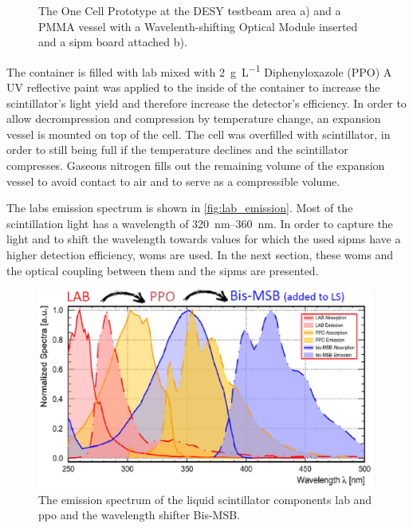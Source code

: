 \begin{figure}
\begin{subfigure}[b]{.54\textwidth}
		\caption[PMMA vessel]{}
		\label{fig:pmma_vessel}
	\end{subfigure}
	\caption[One Cell Prototype and PMMA vessel]{The One Cell Prototype at the DESY testbeam area a) and a PMMA vessel with a Wavelenth-shifting Optical Module inserted and a \ac{sipm} board attached b). \cite{}}
	\label{fig:one_cell_and_pmma}
\end{figure}

The container is filled with \ac{lab} mixed with \SI{2}{\gram\per\liter} Diphenyloxazole (PPO)%
A UV reflective paint was applied to the inside of the container to increase the scintillator's light yield and therefore increase the detector's efficiency.
In order to allow decrompression and compression by temperature change, an expansion vessel is mounted on top of the cell.
The cell was overfilled with scintillator, in order to still being full if the temperature declines and the scintillator compresses.
Gaseous nitrogen fills out the remaining volume of the expansion vessel to avoid contact to air and to serve as a compressible volume. 

The \ac{lab}s emission spectrum is shown in \autoref{fig:lab_emission}.
Most of the scintillation light has a wavelength of \SIrange{320}{360}{\nano\meter}.
In order to capture the light and to shift the wavelength towards values for which the used \acp{sipm} have a higher detection efficiency, \acp{wom} are used.
In the next section, these \acp{wom} and the optical coupling between them and the \acp{sipm} are presented.
\begin{figure}
	\centering
	\includegraphics[width=.8\textwidth]{pictures/lab_emission}
	\caption[LAB emission spectrum]{The emission spectrum of the liquid scintillator components \ac{lab} and \ac{ppo} and the wavelength shifter Bis-MSB. \cite{}}
	\label{fig:lab_emission}
\end{figure}




